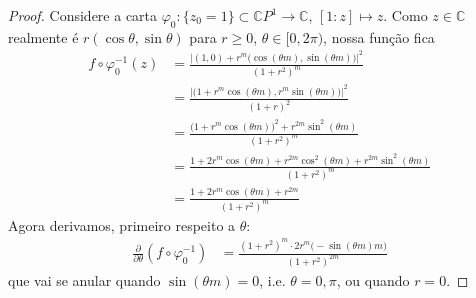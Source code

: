 \begin{proof}\leavevmode
Considere a carta \(\varphi_0:\{z_0=1\}\subset\mathbb{C}P^{1}\to \mathbb{C}\), \([1:z]\mapsto z\). Como \(z \in \mathbb{C}\) realmente é \(r(\cos \theta, \sin  \theta)\) para \(r\geq 0\), \(\theta \in [0, 2\pi)\), nossa função fica
\begin{align*}
f\circ \varphi_0^{-1}(z)&=\frac{ \Big|(1,0)+r^m\Big(\cos (\theta m), \sin (\theta m)\Big)\Big|^2}{(1+r^2)^m}\\
&=\frac{\Big|\Big(1+r^m\cos (\theta m),r^m \sin (\theta m)\Big)\Big|^2}{(1+r)^2}\\
&=\frac{\Big(1+r^m \cos (\theta m) \Big)^2+ r^{2m} \sin^2(\theta m)}{(1+r^2)^m}\\
&=\frac{1+2 r^m \cos (\theta m)+r^{2m} \cos^2(\theta m)+r^{2m} \sin^2 (\theta m)}{(1+r^2)^m}\\
&=\frac{1+2r^m \cos (\theta m)+r^{2m}}{(1+r^2)^m}
\end{align*}
Agora derivamos, primeiro respeito a \(\theta\):
\begin{align*}
\frac{\partial }{\partial \theta}(f \circ \varphi_0^{-1})&= \frac{(1+r^2)^m\cdot  2r^m \Big(-\sin(\theta m)m\Big)}{(1+r^2)^{2m}}
\end{align*}
que vai se anular quando \(\sin  (\theta m)=0\), i.e. \(\theta =0,\pi\), ou quando \(r=0\).


\end{proof}
